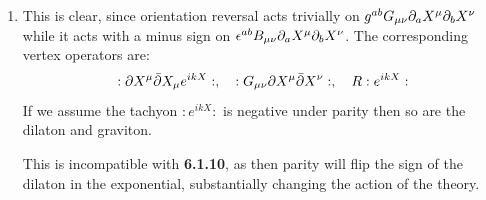\documentclass[11pt, class=article, crop=false]{standalone}
\begin{document}
\begin{enumerate}
	\item This is clear, since orientation reversal acts trivially on $g^{ab} G_{\mu \nu} \partial_a X^\mu \partial_b X^\nu$ while it acts with a minus sign on $\epsilon^{ab} B_{\mu \nu} \partial_a X^\mu \partial_b X^\nu$. The corresponding vertex operators are:
	\[
		:\partial X^\mu \bar {\partial} X_\mu e^{i k X}:, \quad   :G_{\mu \nu} \partial X^{\mu} \bar {\partial} X^\nu:, \quad R :e^{i k X}:
	\]
	If we assume the tachyon $:e^{i k X}:$ is negative under parity then so are the dilaton and graviton. 
	
	This is incompatible with \textbf{6.1.10}, as then parity will flip the sign of the dilaton in the exponential, substantially changing the action of the theory. 
	
\end{enumerate}

\end{document}
